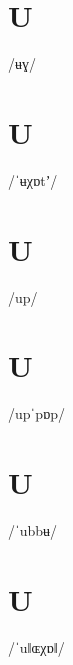 \documentclass[10pt,a4paper,twoside]{book}
\begin{document}
\section*{U}

\begin{multicols}{3}
 {/ʉɣ/} {}
\end{multicols}

\section*{U}

\begin{multicols}{3}
 {/ˈʉχɒtʼ/} {}
\end{multicols}

\section*{U}

\begin{multicols}{3}
 {/up/} {}
\end{multicols}

\section*{U}

\begin{multicols}{3}
 {/upˈpɒp/} {}
\end{multicols}

\section*{U}

\begin{multicols}{3}
 {/ˈubbʉ/} {}
\end{multicols}

\section*{U}

\begin{multicols}{3}
 {/ˈuǁɶχɒǁ/} {}
\end{multicols}
\end{document}
